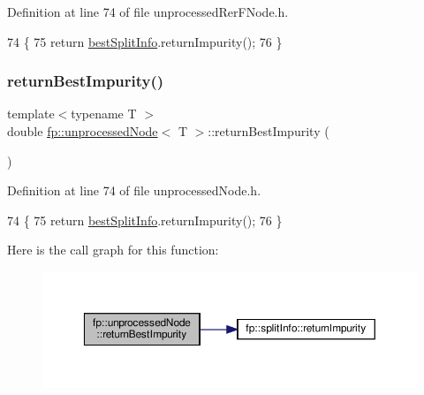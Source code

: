 Definition at line 74 of file unprocessed\+Rer\+F\+Node.\+h.


\begin{DoxyCode}
74                                                   \{
75                     \textcolor{keywordflow}{return} \hyperlink{classfp_1_1unprocessedNode_ae60e5f84c9a80537cb84dfd17e70e893}{bestSplitInfo}.returnImpurity();
76                 \}
\end{DoxyCode}
\mbox{\label{classfp_1_1unprocessedNode_a1b147714de502bcff5c727d2ce9144f8}} 
\subsubsection{\texorpdfstring{return\+Best\+Impurity()}{returnBestImpurity()}\hspace{0.1cm}{\footnotesize\ttfamily [2/2]}}
{\footnotesize\ttfamily template$<$typename T $>$ \\
double \hyperlink{classfp_1_1unprocessedNode}{fp\+::unprocessed\+Node}$<$ T $>$\+::return\+Best\+Impurity (\begin{DoxyParamCaption}{ }\end{DoxyParamCaption})\hspace{0.3cm}{\ttfamily [inline]}}



Definition at line 74 of file unprocessed\+Node.\+h.


\begin{DoxyCode}
74                                                   \{
75                     \textcolor{keywordflow}{return} \hyperlink{classfp_1_1unprocessedNode_ae60e5f84c9a80537cb84dfd17e70e893}{bestSplitInfo}.returnImpurity();
76                 \}
\end{DoxyCode}
Here is the call graph for this function\+:
\nopagebreak
\begin{figure}[H]
\begin{center}
\leavevmode
\includegraphics[width=350pt]{classfp_1_1unprocessedNode_a1b147714de502bcff5c727d2ce9144f8_cgraph}
\end{center}
\end{figure}
\mbox{\label{classfp_1_1unprocessedNode_ac1b4cb820f5c29832f9a7ea7bf896139}} 
